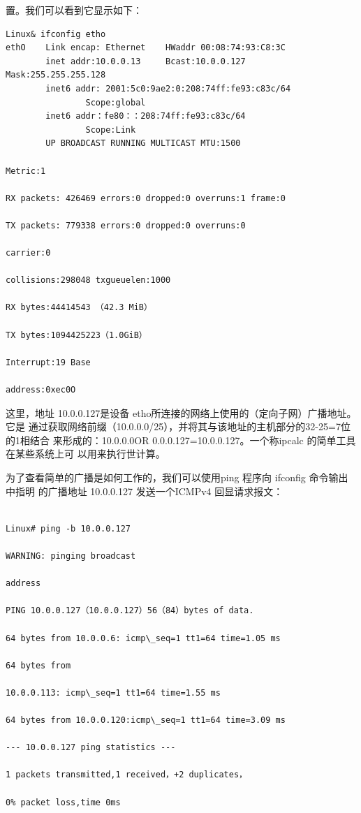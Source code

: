 置。我们可以看到它显示如下：
\begin{verbatim}
Linux& ifconfig etho
ethO    Link encap: Ethernet    HWaddr 00:08:74:93:C8:3C
        inet addr:10.0.0.13     Bcast:10.0.0.127   Mask:255.255.255.128
        inet6 addr: 2001:5c0:9ae2:0:208:74ff:fe93:c83c/64
                Scope:global
        inet6 addr：fe80：：208:74ff:fe93:c83c/64
                Scope:Link
        UP BROADCAST RUNNING MULTICAST MTU:1500

Metric:1

RX packets: 426469 errors:0 dropped:0 overruns:1 frame:0

TX packets: 779338 errors:0 dropped:0 overruns:0

carrier:0

collisions:298048 txgueuelen:1000

RX bytes:44414543 （42.3 MiB）

TX bytes:1094425223（1.0GiB）

Interrupt:19 Base

address:0xec0O
\end{verbatim}

这里，地址 10.0.0.127是设备 etho所连接的网络上使用的（定向子网）广播地址。它是
通过获取网络前缀（10.0.0.0/25），并将其与该地址的主机部分的32-25=7位的1相结合
来形成的：10.0.0.0OR 0.0.0.127=10.0.0.127。一个称ipcalc 的简单工具在某些系统上可
以用来执行世计算。

为了查看简单的广播是如何工作的，我们可以使用ping 程序向 ifconfig 命令输出中指明
的广播地址 10.0.0.127 发送一个ICMPv4 回显请求报文：

\begin{verbatim}
    
Linux# ping -b 10.0.0.127

WARNING: pinging broadcast

address

PING 10.0.0.127（10.0.0.127）56（84）bytes of data.

64 bytes from 10.0.0.6: icmp\_seq=1 tt1=64 time=1.05 ms

64 bytes from

10.0.0.113: icmp\_seq=1 tt1=64 time=1.55 ms

64 bytes from 10.0.0.120:icmp\_seq=1 tt1=64 time=3.09 ms

--- 10.0.0.127 ping statistics ---

1 packets transmitted,1 received，+2 duplicates，

0% packet loss,time 0ms
\end{verbatim}

